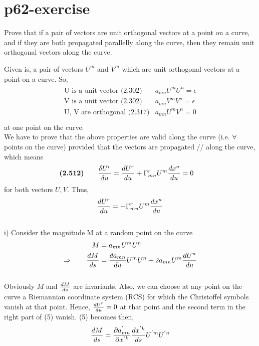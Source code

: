 \section{p62-exercise}
\begin{tcolorbox}
Prove that if a pair of vectors are unit orthogonal vectors at a point on a curve, and if they are both propagated parallelly along the curve, then they remain unit orthogonal vectors along the curve.
\end{tcolorbox}
Given is, a pair of vectors $U^m$ and $V^m$ which are unit orthogonal vectors at a point on a curve. So,
\begin{align}
\begin{array}{cc}
\text{U is a unit vector (2.302)}& a_{mn}U^m U^n = \epsilon\\
\text{V is a unit vector (2.302)}& a_{mn}V^m V^n = \epsilon\\
\text{U, V are orthogonal (2.317)}& a_{mn}U^m V^n = 0\\
\end{array}
\end{align}
at one point on the curve.\\
We have to prove that the above properties are valid along the curve (i.e. $\forall$ points on the curve) provided that the vectors are propagated // along the curve, which means
\begin{align}
\textbf{(2.512)}\quad\quad \frac{\delta U^r}{\delta u} &= \dv{U^r}{u} + \Gamma^r_{mn}U^m \dv{x^n}{u} = 0
\end{align}
for both vectors $U, V$. Thus,
\begin{align}
\dv{U^r}{u} = - \Gamma^r_{mn}U^m \dv{x^n}{u}
\end{align}\\
i) Consider the magnitude M at a random point on the curve
\begin{align}
\ M &= a_{mn}U^m U^n \\
\Rightarrow \quad\quad \dv{M}{s} &= \dv{a_{mn}}{u}U^m U^n + 2a_{mn}U^m \dv{U^n}{u} 
\end{align}\\
Obviously $M$ and $\dv{M}{s}$ are invariants. Also, we can choose at any point on the curve a Riemannian coordinate system (RCS) for which the Christoffel symbols vanish at that point. Hence, $\dv{U^r}{u} = 0 $ at that point and the second term in the right part of (5) vanish. (5) becomes then,
\begin{align}
 \dv{M}{s} = \pdv{a^{'}_{mn}}{x^{'k}}\dv{x^{'k}}{s}U^{'m} U^{'n}  
\end{align}
